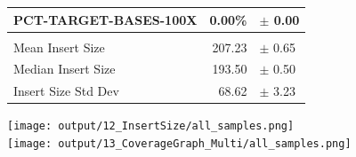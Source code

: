 \documentclass[10pt,twoside,english]{scrartcl}
\begin{document}
\begin{landscape}
\begin{minipage}[c][6in]{9.3in}
\begin{minipage}[c][6in]{4in}
\begin{tabular}{lrl}
PCT-TARGET-BASES-100X   & 0.00\%  & $\pm$ 0.00\\ 
\hline 
\\ 
\hline 
Mean Insert Size        & 207.23  & $\pm$ 0.65 \\ 
Median Insert Size      & 193.50  & $\pm$ 0.50 \\ 
Insert Size Std Dev     & 68.62  & $\pm$ 3.23 \\ 
\hline 
\end{tabular}
\end{minipage}%
\begin{minipage}[c][6in]{5in}
\centering 
\texttt{[image: output/12\_InsertSize/all\_samples.png]}\\ 
\vfill 
\texttt{[image: output/13\_CoverageGraph\_Multi/all\_samples.png]} 
\end{minipage} 
\end{minipage} 
\end{landscape} 
\end{document}
